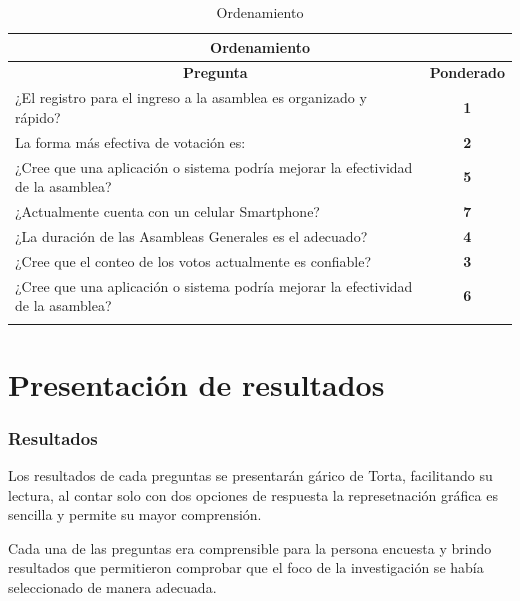 \vspace{0.5cm}

\begin{longtable}[c]{|p{7.5cm}|c|}
	\hline
	\multicolumn{2}{|c|}{\textbf{Ordenamiento}}                                                          \\ \hline
	\multicolumn{1}{|c|}{\textbf{Pregunta}}                                          & \textbf{Ponderado} \\ \hline
	¿El registro para el ingreso a la asamblea es organizado y rápido?               & \textbf{1}        \\ \hline
	La forma más efectiva de votación es:                                            & \textbf{2}        \\ \hline
	¿Cree que una aplicación o sistema podría mejorar la efectividad de la asamblea? & \textbf{5}        \\ \hline
	¿Actualmente cuenta con un celular Smartphone?                                   & \textbf{7}        \\ \hline
	¿La duración de las Asambleas Generales es el adecuado?                          & \textbf{4}        \\ \hline
	¿Cree que el conteo de los votos actualmente es confiable?                       & \textbf{3}        \\ \hline
	¿Cree que una aplicación o sistema podría mejorar la efectividad de la asamblea? & \textbf{6}        \\ \hline
	\caption{Ordenamiento}
\end{longtable}

\section{Presentación de resultados}

\subsubsection{Resultados}

Los resultados de cada preguntas se presentarán gárico de Torta, facilitando su lectura, al contar solo con dos opciones de respuesta la represetnación gráfica es sencilla y permite su mayor comprensión.

\vspace{0.5cm}

Cada una de las preguntas era comprensible para la persona encuesta y brindo resultados que permitieron comprobar que el foco de la investigación se había seleccionado de manera adecuada.


